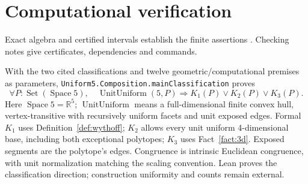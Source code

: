 \documentclass[11pt]{article}
\theoremstyle{definition}
\theoremstyle{remark}
\begin{document}
\section{Computational verification}\label{sec:verification}\label{sec:lean}
Exact algebra and certified intervals establish the finite assertions
\cite{Johansson2017}. Checking notes give certificates, dependencies and commands.

With the two cited classifications and twelve geometric/computational
premises as parameters, \texttt{Uniform5.Composition.mainClassification} proves
\[
 \forall P:\operatorname{Set}(\operatorname{Space}5),\quad
 \operatorname{UnitUniform}(5,P)\Longrightarrow K_1(P)\lor K_2(P)\lor K_3(P).
\]
Here $\operatorname{Space}5=\mathbb R^5$;
$\operatorname{UnitUniform}$ means a full-dimensional finite convex hull,
vertex-transitive with recursively uniform facets and unit exposed edges.
Formal $K_1$ uses Definition~\ref{def:wythoff}; $K_2$ allows every unit uniform 4-dimensional base, including both exceptional polytopes; $K_3$ uses Fact~\ref{fact:3d}. Exposed segments are the polytope's edges. Congruence is intrinsic Euclidean congruence, with unit normalization matching the scaling convention. Lean proves the classification direction; construction uniformity and counts remain external.
\end{document}
